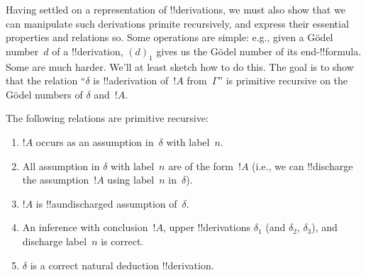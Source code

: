 \documentclass[../../../include/open-logic-section]{subfiles}
\begin{document}
\begin{explain}
Having settled on a representation of !!{derivation}s, we must also
show that we can manipulate such derivations primite recursively, and
express their essential properties and relations so.  Some operations
are simple: e.g., given a G\"odel number~$d$ of a !!{derivation},
$(d)_1$ gives us the G\"odel number of its end-!!{formula}.  Some are
much harder.  We'll at least sketch how to do this.  The goal is to
show that the relation ``$\delta$ is !!a{derivation} of~$!A$
from~$\Gamma$'' is primitive recursive on the G\"odel numbers of
$\delta$ and~$!A$.
\end{explain}

\begin{prop}
The following relations are primitive recursive:
\begin{enumerate}
\item $!A$ occurs as an assumption in~$\delta$ with label~$n$.
\item All assumption in $\delta$ with label~$n$ are of the form~$!A$
  (i.e., we can !!{discharge} the assumption~$!A$ using label~$n$
  in~$\delta$).
\item $!A$ is !!a{undischarged} assumption of~$\delta$.
\item An inference with conclusion~$!A$, upper !!{derivation}s
  $\delta_1$ (and $\delta_2$, $\delta_3$), and discharge label~$n$ is
  correct.
\item $\delta$ is a correct natural deduction !!{derivation}.
\end{enumerate}
\end{prop}
\end{document}
